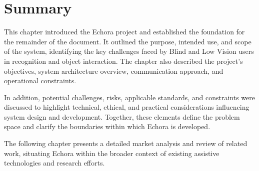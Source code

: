 \section{Summary}

This chapter introduced the Echora project and established the foundation for the remainder of the document. It outlined the purpose, intended use, and scope of the system, identifying the key challenges faced by Blind and Low Vision users in recognition and object interaction. The chapter also described the project’s objectives, system architecture overview, communication approach, and operational constraints.

In addition, potential challenges, risks, applicable standards, and constraints were discussed to highlight technical, ethical, and practical considerations influencing system design and development. Together, these elements define the problem space and clarify the boundaries within which Echora is developed.

The following chapter presents a detailed market analysis and review of related work, situating Echora within the broader context of existing assistive technologies and research efforts.
